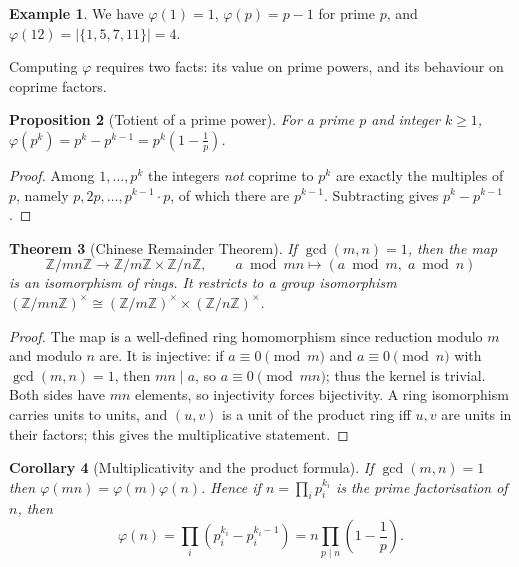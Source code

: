 \documentclass[11pt,a4paper]{article}
\newtheorem{theorem}{Theorem}[section]
\newtheorem{proposition}[theorem]{Proposition}
\newtheorem{corollary}[theorem]{Corollary}
\theoremstyle{definition}
\newtheorem{example}[theorem]{Example}
\theoremstyle{remark}
\newcommand{\Z}{\ensuremath{\mathbb{Z}}}
\begin{document}
\begin{example}\label{numbertheory:ex:totient-small}
We have \(\varphi(1)=1\), \(\varphi(p)=p-1\) for prime \(p\), and \(\varphi(12)=\lvert\{1,5,7,11\}\rvert = 4\).
\end{example}

Computing \(\varphi\) requires two facts: its value on prime powers, and its behaviour on coprime factors.

\begin{proposition}[Totient of a prime power]\label{numbertheory:prop:totient-prime-power}
For a prime \(p\) and integer \(k \ge 1\), \(\varphi(p^k) = p^k - p^{k-1} = p^k\left(1 - \tfrac1p\right)\).
\end{proposition}

\begin{proof}
Among \(1,\dots,p^k\) the integers \emph{not} coprime to \(p^k\) are exactly the multiples of \(p\), namely \(p, 2p, \dots, p^{k-1}\cdot p\), of which there are \(p^{k-1}\). Subtracting gives \(p^k - p^{k-1}\).
\end{proof}

\begin{theorem}[Chinese Remainder Theorem]\label{numbertheory:thm:crt}
If \(\gcd(m,n)=1\), then the map
\[
\Z/mn\Z \longrightarrow \Z/m\Z \times \Z/n\Z, \qquad a \bmod mn \longmapsto (a \bmod m,\; a \bmod n)
\]
is an isomorphism of rings. It restricts to a group isomorphism \((\Z/mn\Z)^\times \cong (\Z/m\Z)^\times \times (\Z/n\Z)^\times\).
\end{theorem}

\begin{proof}
The map is a well-defined ring homomorphism since reduction modulo \(m\) and modulo \(n\) are. It is injective: if \(a \equiv 0 \pmod m\) and \(a \equiv 0 \pmod n\) with \(\gcd(m,n)=1\), then \(mn \mid a\), so \(a \equiv 0 \pmod{mn}\); thus the kernel is trivial. Both sides have \(mn\) elements, so injectivity forces bijectivity. A ring isomorphism carries units to units, and \((u,v)\) is a unit of the product ring iff \(u,v\) are units in their factors; this gives the multiplicative statement.
\end{proof}

\begin{corollary}[Multiplicativity and the product formula]\label{numbertheory:cor:totient-mult}
If \(\gcd(m,n)=1\) then \(\varphi(mn) = \varphi(m)\varphi(n)\). Hence if \(n = \prod_i p_i^{k_i}\) is the prime factorisation of \(n\), then
\[
\varphi(n) = \prod_i \left(p_i^{k_i} - p_i^{k_i-1}\right) = n \prod_{p \mid n}\left(1 - \frac1p\right).
\]
\end{corollary}
\end{document}
